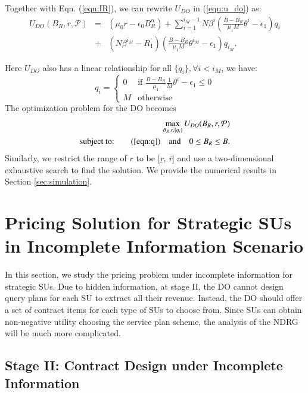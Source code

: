 \documentclass[journal]{IEEEtran}
\begin{document}
Together with Eqn. (\ref{eqn:IR}), we can rewrite $U_{DO}$ in (\ref{eqn:u_do}) as:
\begin{eqnarray}
U_{DO}(B_R, r, \mathcal{P})&=&\left(\mu_0r-\epsilon_0B_R^{\alpha}\right) + \sum_{i=1}^{i_M-1} N\beta^i\left(\frac{B-B_R}{\mu_1M}\theta^i-\epsilon_1\right) q_i \nonumber\\
&+&\left(N\beta^{i_M}-R_1\right)\left(\frac{B-B_R}{\mu_1M}\theta^{i_M}-\epsilon_1\right) q_{i_M}.
\end{eqnarray}

Here $U_{DO}$ also has a linear relationship for all $\{q_i\},\forall i<i_M$, we have:
\begin{equation}
\label{eqn:q}
q_i=\left\{
\begin{array}{ll}
0 & \textrm{if $\frac{B-B_R}{\mu_1}\frac{1}{M}\theta^i-\epsilon_1\leq0$} \\
M & \textrm{otherwise}
\end{array}
\right.
\end{equation}
The optimization problem for the DO becomes
\begin{eqnarray}
\label{eqn:max_udo2}
&&\max_{B_R, r, \{q_i\}} U_{DO}(B_R, r, \mathcal{P}) \nonumber\\
&\textrm{subject to:}& \quad (\ref{eqn:q}) \quad\textrm{and}\quad 0\leq B_R\leq B.
\end{eqnarray}
Similarly, we restrict the range of $r$ to be [\emph{\b{r}}, \emph{\={r}}] and use a two-dimensional exhaustive search to find the solution. We provide the numerical results in Section \ref{sec:simulation}.

\section{Pricing Solution for Strategic SUs in Incomplete Information Scenario}
\label{sec:strategic_incomplete}

In this section, we study the pricing problem under incomplete information for strategic SUs. Due to hidden information, at stage II, the DO cannot design query plans for each SU to extract all their revenue. Instead, the DO should offer a set of contract items for each type of SUs to choose from. Since SUs can obtain non-negative utility choosing the service plan scheme, the analysis of the NDRG will be much more complicated.

\subsection{Stage II: Contract Design under Incomplete Information}
\end{document}

